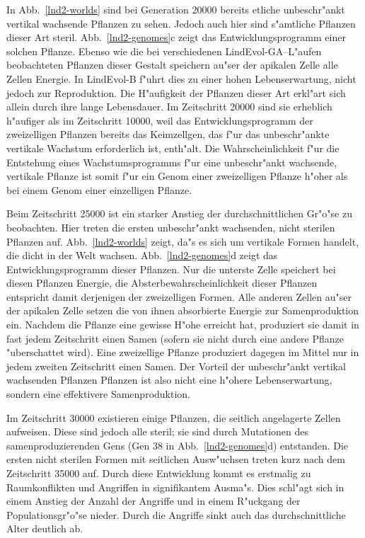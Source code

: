 In Abb.\ \ref{lnd2-worlds} sind bei Generation 20000 bereits etliche unbeschr"ankt vertikal wachsende Pflanzen zu sehen.
Jedoch auch hier sind s"amtliche Pflanzen dieser Art steril. Abb.\ \ref{lnd2-genomes}c zeigt das Entwicklungsprogramm
einer solchen Pflanze. Ebenso wie die bei verschiedenen LindEvol-GA--L"aufen beobachteten Pflanzen dieser Gestalt
speichern au"ser der apikalen Zelle alle Zellen Energie. In LindEvol-B f"uhrt dies zu einer hohen Lebenserwartung,
nicht jedoch zur Reproduktion. Die H"aufigkeit der Pflanzen dieser Art erkl"art sich allein durch ihre lange Lebensdauer.
Im Zeitschritt 20000 sind sie erheblich h"aufiger als im Zeitschritt 10000, weil das Entwicklungsprogramm der zweizelligen
Pflanzen bereits das Keimzellgen, das f"ur das unbeschr"ankte vertikale Wachstum erforderlich ist, enth"alt. Die 
Wahrscheinlichkeit f"ur die Entstehung eines Wachstumsprogramms f"ur eine unbeschr"ankt wachsende, vertikale Pflanze
ist somit f"ur ein Genom einer zweizelligen Pflanze h"oher als bei einem Genom einer einzelligen Pflanze.

Beim Zeitschritt 25000 ist ein starker Anstieg der durchschnittlichen Gr"o"se zu beobachten. Hier treten die ersten
unbeschr"ankt wachsenden, nicht sterilen Pflanzen auf. Abb.\ \ref{lnd2-worlds} zeigt, da"s es sich um vertikale Formen
handelt, die dicht in der Welt wachsen. Abb.\ \ref{lnd2-genomes}d zeigt das Entwicklungsprogramm dieser Pflanzen.
Nur die unterste Zelle speichert bei diesen Pflanzen Energie, die Absterbewahrscheinlichkeit dieser Pflanzen entspricht
damit derjenigen der zweizelligen Formen. Alle anderen Zellen au"ser der apikalen Zelle setzen die von ihnen absorbierte
Energie zur Samenproduktion ein. Nachdem die Pflanze eine gewisse H"ohe erreicht hat, produziert sie damit in fast jedem
Zeitschritt einen Samen (sofern sie nicht durch eine andere Pflanze "uberschattet wird). Eine zweizellige Pflanze produziert
dagegen im Mittel nur in jedem zweiten Zeitschritt einen Samen. Der Vorteil der unbeschr"ankt vertikal wachsenden Pflanzen
Pflanzen ist also nicht eine h"ohere Lebenserwartung, sondern eine effektivere Samenproduktion.

Im Zeitschritt 30000 existieren einige Pflanzen, die seitlich angelagerte Zellen aufweisen. Diese sind jedoch alle
steril; sie sind durch Mutationen des samenproduzierenden Gens (Gen 38 in Abb.\ \ref{lnd2-genomes}d) entstanden.
Die ersten nicht sterilen Formen mit seitlichen Ausw"uchsen treten kurz nach dem Zeitschritt 35000 auf. Durch diese
Entwicklung kommt es erstmalig zu Raumkonflikten und Angriffen in signifikantem Ausma"s. Dies schl"agt sich in einem
Anstieg der Anzahl der Angriffe und in einem R"uckgang der Populationsgr"o"se nieder. Durch die Angriffe sinkt auch
das durchschnittliche Alter deutlich ab.

